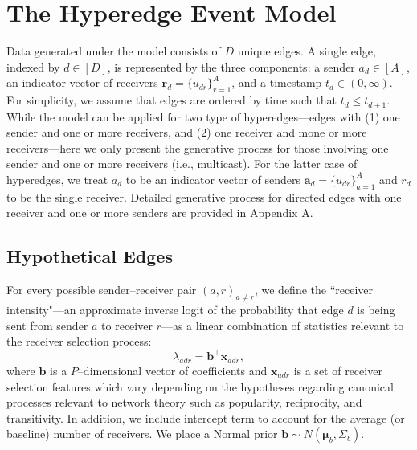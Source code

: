 \documentclass[ba]{imsart}
\numberwithin{equation}{section}
\theoremstyle{plain}
\begin{document}
\section{The Hyperedge Event Model}\label{sec:generative process}

Data generated under the model consists of $D$ unique edges. A single edge, indexed by $d \in [D]$, is represented by the three components: a sender $a_d \in [A]$, an indicator vector of receivers $\boldsymbol{r}_d = \{u_{dr} \}_{r=1}^{A}$, and a timestamp $t_d \in (0, \infty)$. For simplicity, we assume that edges are ordered by time such that $t_d \leq t_{d+1}$. While the model can be applied for two type of hyperedges---edges with (1) one sender and one or more receivers, and (2) one receiver and mone or more receivers---here we only present the generative process for those involving one sender and one or more receivers (i.e., multicast). For the latter case of hyperedges, we treat $a_d$ to be an indicator vector of senders $\boldsymbol{a}_d = \{u_{dr} \}_{a=1}^{A}$ and $r_d$ to be the single receiver. Detailed generative process for directed edges with one receiver and one or more senders are provided in Appendix A.

\subsection{Hypothetical Edges}\label{subsec: Tie}
For every possible sender--receiver pair $(a,r)_{a \neq r}$, we define the ``receiver intensity"---an approximate inverse logit of the probability that edge $d$ is being sent from sender $a$ to receiver $r$---as a linear combination of statistics relevant to the receiver selection process:
\begin{equation}
\lambda_{adr} = {\boldsymbol{b}}^{\top}\boldsymbol{x}_{adr},
\end{equation}
where $\boldsymbol{b}$ is a $P$--dimensional vector of coefficients and $\boldsymbol{x}_{adr}$ is a set of receiver selection features which vary depending on the hypotheses regarding canonical processes relevant to network theory such as popularity, reciprocity, and transitivity. In addition, we include intercept term to account for the average (or baseline) number of receivers. We place a Normal prior $\boldsymbol{b} \sim N(\boldsymbol{\mu}_b, \Sigma_b)$.
\end{document}
